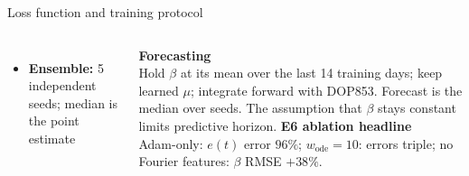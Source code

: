 \begin{frame}{Loss function and training protocol}
\begin{columns}[T,onlytextwidth]
\begin{itemize}
    \item \textbf{Ensemble:} 5 independent seeds; median is the point estimate
  \end{itemize}
  \vspace{4pt}
  \textbf{\color{mvPINN}Forecasting}\\
  {\small Hold $\beta$ at its mean over the last 14 training days; keep learned $\mu$; integrate forward with DOP853. Forecast is the median over seeds. The assumption that $\beta$ stays constant limits predictive horizon.}
  \vspace{4pt}
  \textbf{\color{mvMuted}E6 ablation headline}\\
  {\small Adam-only: $e(t)$ error $96\%$; $w_{\text{ode}}=10$: errors triple; no Fourier features: $\beta$ RMSE $+38\%$.}
\end{columns}
\end{frame}

